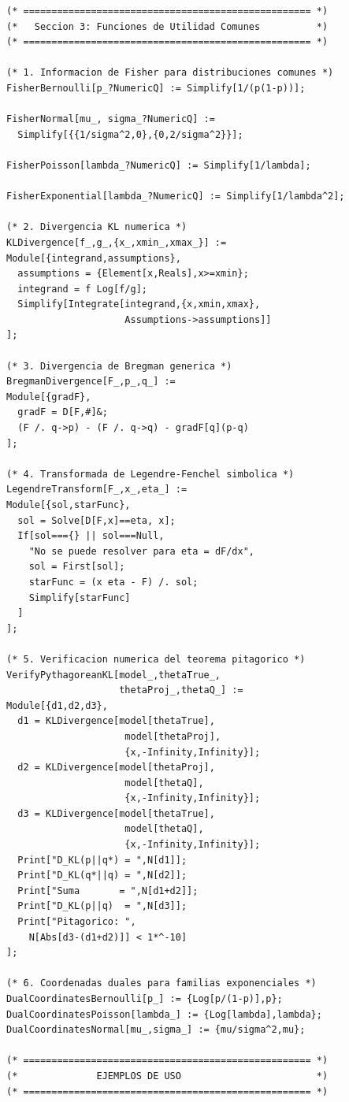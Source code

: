 \begin{lstlisting}
(* =================================================== *)
(*   Seccion 3: Funciones de Utilidad Comunes          *)
(* =================================================== *)

(* 1. Informacion de Fisher para distribuciones comunes *)
FisherBernoulli[p_?NumericQ] := Simplify[1/(p(1-p))];

FisherNormal[mu_, sigma_?NumericQ] :=
  Simplify[{{1/sigma^2,0},{0,2/sigma^2}}];

FisherPoisson[lambda_?NumericQ] := Simplify[1/lambda];

FisherExponential[lambda_?NumericQ] := Simplify[1/lambda^2];

(* 2. Divergencia KL numerica *)
KLDivergence[f_,g_,{x_,xmin_,xmax_}] :=
Module[{integrand,assumptions},
  assumptions = {Element[x,Reals],x>=xmin};
  integrand = f Log[f/g];
  Simplify[Integrate[integrand,{x,xmin,xmax},
                     Assumptions->assumptions]]
];

(* 3. Divergencia de Bregman generica *)
BregmanDivergence[F_,p_,q_] :=
Module[{gradF},
  gradF = D[F,#]&;
  (F /. q->p) - (F /. q->q) - gradF[q](p-q)
];

(* 4. Transformada de Legendre-Fenchel simbolica *)
LegendreTransform[F_,x_,eta_] :=
Module[{sol,starFunc},
  sol = Solve[D[F,x]==eta, x];
  If[sol==={} || sol===Null,
    "No se puede resolver para eta = dF/dx",
    sol = First[sol];
    starFunc = (x eta - F) /. sol;
    Simplify[starFunc]
  ]
];

(* 5. Verificacion numerica del teorema pitagorico *)
VerifyPythagoreanKL[model_,thetaTrue_,
                    thetaProj_,thetaQ_] :=
Module[{d1,d2,d3},
  d1 = KLDivergence[model[thetaTrue],
                     model[thetaProj],
                     {x,-Infinity,Infinity}];
  d2 = KLDivergence[model[thetaProj],
                     model[thetaQ],
                     {x,-Infinity,Infinity}];
  d3 = KLDivergence[model[thetaTrue],
                     model[thetaQ],
                     {x,-Infinity,Infinity}];
  Print["D_KL(p||q*) = ",N[d1]];
  Print["D_KL(q*||q) = ",N[d2]];
  Print["Suma       = ",N[d1+d2]];
  Print["D_KL(p||q)  = ",N[d3]];
  Print["Pitagorico: ",
    N[Abs[d3-(d1+d2)]] < 1*^-10]
];

(* 6. Coordenadas duales para familias exponenciales *)
DualCoordinatesBernoulli[p_] := {Log[p/(1-p)],p};
DualCoordinatesPoisson[lambda_] := {Log[lambda],lambda};
DualCoordinatesNormal[mu_,sigma_] := {mu/sigma^2,mu};

(* =================================================== *)
(*              EJEMPLOS DE USO                        *)
(* =================================================== *)


\end{lstlisting}

